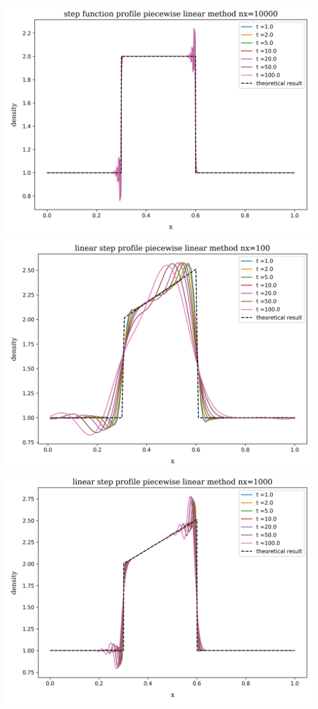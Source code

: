 \begin{frame}
\begin{columns}
			\includegraphics[height=.33\textheight]{../results/1D/pwlin/nx=10000/plot_advection_step_function_pwlin_nx=10000.png}
			\centering
			\includegraphics[height=.33\textheight]{../results/1D/pwlin/nx=100/plot_advection_linear_step_pwlin_nx=100.png}\\
			\includegraphics[height=.33\textheight]{../results/1D/pwlin/nx=1000/plot_advection_linear_step_pwlin_nx=1000.png}\\

\end{columns}
\end{frame}
